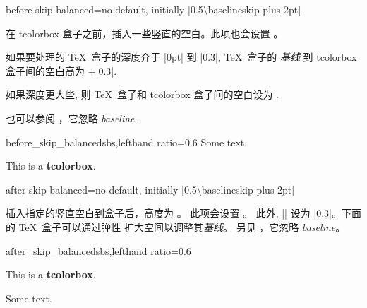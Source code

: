 \begin{docTcbKey}[][doc new={2020-09-25}]{before skip balanced}{=}{no default, initially |0.5\textbackslash baselineskip plus 2pt|}

在 tcolorbox 盒子之前，插入一些竖直的空白。此项也会设置 。\par
如果要处理的 \TeX\ 盒子的深度介于 |0pt| 到 |0.3\baselineskip|,
\TeX\ 盒子的 \emph{基线} 到 tcolorbox 盒子间的空白高为 $+$|0.3\baselineskip|.\par
如果深度更大些, 则 \TeX\ 盒子和 tcolorbox 盒子间的空白设为 .\par
也可以参阅 ，它忽略 \emph{baseline}.

\begin{exdispExample*}{before_skip_balanced}{sbs,lefthand ratio=0.6}
Some text.
\begin{tcolorbox}[before skip balanced=1cm,
    colframe=red!50!white]
  This is a \textbf{tcolorbox}.
\end{tcolorbox}
\end{exdispExample*}
\end{docTcbKey}


\begin{docTcbKey}[][doc new={2020-09-25}]{after skip balanced}{=}{no default, initially |0.5\textbackslash baselineskip plus 2pt|}

插入指定的竖直空白到盒子后，高度为 。%
此项会设置 。%
此外, |\prevdepth| 设为 |0.3\baselineskip|。下面的 \TeX\ 盒子可以通过弹性%
扩大空间以调整其\emph{基线}。%
另见 ，它忽略 \emph{baseline}。

\begin{exdispExample*}{after_skip_balanced}{sbs,lefthand ratio=0.6}
\begin{tcolorbox}[after skip balanced=1cm,
    colframe=red!50!white]
  This is a \textbf{tcolorbox}.
\end{tcolorbox}
Some text.
\end{exdispExample*}
\end{docTcbKey}



